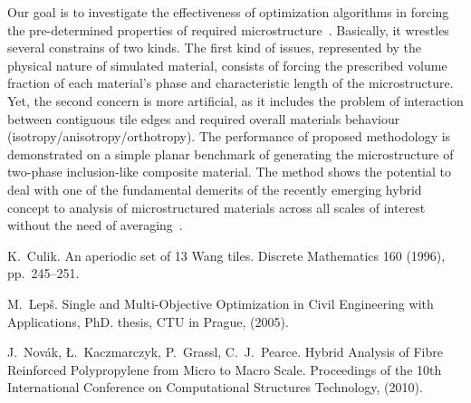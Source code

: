 Our goal is to investigate the effectiveness of optimization
algorithms in forcing the pre-determined properties of required
microstructure~\cite{Leps05}. Basically, it wrestles several
constrains of two kinds. The first kind of issues, represented by
the physical nature of simulated material, consists of forcing the
prescribed volume fraction of each material's phase and
characteristic length of the microstructure. Yet, the second
concern is more artificial, as it includes the problem of
interaction between contiguous tile edges and required overall
materials behaviour (isotropy/anisotropy/orthotropy). The
performance of proposed methodology is demonstrated on a simple
planar benchmark of generating the microstructure of two-phase
inclusion-like composite material. The method shows the potential
to deal with one of the fundamental demerits of the recently
emerging hybrid concept to analysis of microstructured materials
across all scales of interest without the need of
averaging~\cite{Novak10}.


\begin{thebibliography}{10}

{\sc K.~Culik}.
{An aperiodic set of 13 Wang tiles}. Discrete Mathematics 160 (1996), pp.~245--251.

{\sc M.~Lep\v{s}}. {Single and Multi-Objective Optimization in Civil Engineering with Applications}, PhD. thesis, CTU in Prague, (2005).

{\sc J.~Nov\'{a}k, \L.~Kaczmarczyk, P.~Grassl, C.~J.~Pearce}. {Hybrid Analysis of Fibre Reinforced Polypropylene from Micro to Macro Scale}. Proceedings of the 10th International Conference on Computational Structures Technology, (2010).

\end{thebibliography}

